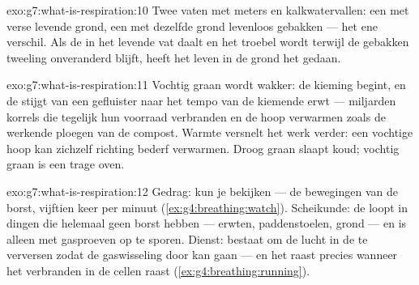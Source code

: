 \begin{solution}{exo:g7:what-is-respiration:10}
Twee vaten met meters en kalkwatervallen: een met verse levende grond,
een met dezelfde grond levenloos gebakken --- het ene verschil. Als de
 in het levende vat daalt en het  troebel wordt terwijl
de gebakken tweeling onveranderd blijft, heeft het leven in de grond het
gedaan.
\end{solution}

\begin{solution}{exo:g7:what-is-respiration:11}
Vochtig graan wordt wakker: de kieming begint, en de  stijgt
van een gefluister naar het tempo van de kiemende erwt --- miljarden
korrels die tegelijk hun voorraad verbranden en de hoop verwarmen zoals
de werkende ploegen van de compost. Warmte versnelt het werk verder: een
vochtige hoop kan zichzelf richting bederf verwarmen. Droog graan slaapt
koud; vochtig graan is een trage oven.
\end{solution}

\begin{solution}{exo:g7:what-is-respiration:12}
Gedrag:  kun je bekijken --- de bewegingen van de borst, vijftien
keer per minuut (\cref{ex:g4:breathing:watch}). Scheikunde: de 
loopt in dingen die helemaal geen borst hebben --- erwten, paddenstoelen,
grond --- en is alleen met gasproeven op te sporen. Dienst: 
bestaat om de lucht in de  te verversen zodat de gaswisseling door
kan gaan --- en het raast precies wanneer het verbranden in de cellen
raast (\cref{ex:g4:breathing:running}).
\end{solution}

